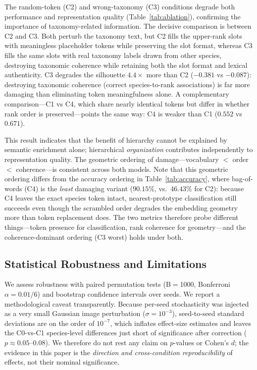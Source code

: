 The random-token (C2) and wrong-taxonomy (C3) conditions degrade both performance
and representation quality (Table~\ref{tab:ablation}), confirming the importance of
taxonomy-related information. The decisive comparison is between C2 and C3. Both
perturb the taxonomy text, but C2 fills the upper-rank slots with meaningless
placeholder tokens while preserving the slot format, whereas C3 fills the same
slots with real taxonomy labels drawn from other species, destroying taxonomic
coherence while retaining both the slot format and lexical authenticity. C3 degrades
the silhouette $4.4\times$ more than C2 ($-0.381$ vs $-0.087$): destroying
taxonomic coherence (correct species-to-rank associations) is far more damaging
than eliminating token meaningfulness alone. A complementary comparison---C1 vs C4,
which share nearly identical tokens but differ in whether rank order is
preserved---points the same way: C4 is weaker than C1 ($0.552$ vs $0.671$).

This result indicates that the benefit of hierarchy cannot be explained by semantic
enrichment alone; hierarchical \emph{organization} contributes independently to
representation quality. The geometric ordering of damage---vocabulary $<$ order $<$
coherence---is consistent across both models. Note that this geometric ordering
differs from the accuracy ordering in Table~\ref{tab:accuracy}, where bag-of-words
(C4) is the \emph{least} damaging variant ($90.15\%$, vs.\ $46.43\%$ for C2): because
C4 leaves the exact species token intact, nearest-prototype classification still
succeeds even though the scrambled order degrades the embedding geometry more than
token replacement does. The two metrics therefore probe different things---token
presence for classification, rank coherence for geometry---and the coherence-dominant
ordering (C3 worst) holds under both.

\subsection{Statistical Robustness and Limitations}
\label{sec:robustness}

We assess robustness with paired permutation tests (B$=$1000, Bonferroni
$\alpha = 0.01/6$) and bootstrap confidence intervals over seeds. We report a
methodological caveat transparently. Because per-seed stochasticity was injected as
a very small Gaussian image perturbation ($\sigma = 10^{-3}$), seed-to-seed standard
deviations are on the order of $10^{-7}$, which inflates effect-size estimates and
leaves the C0-vs-C1 species-level differences just short of significance after
correction ($p \approx 0.05$--$0.08$). We therefore do not rest any claim on
$p$-values or Cohen's $d$; the evidence in this paper is the \emph{direction and
cross-condition reproducibility} of effects, not their nominal significance.

